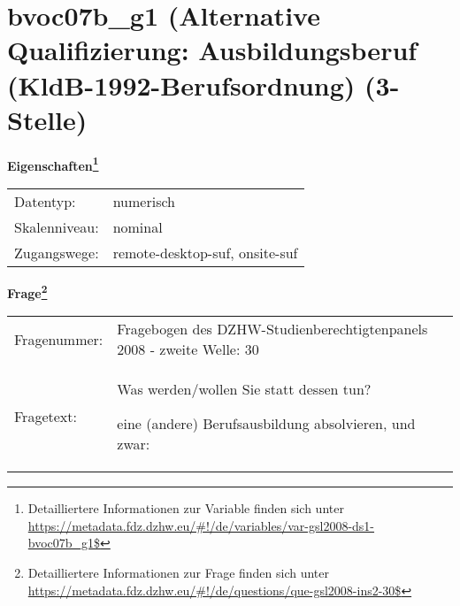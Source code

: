
    \setcounter{footnote}{0}

    \vspace*{-1.8cm}
	\section{bvoc07b\_g1 (Alternative Qualifizierung: Ausbildungsberuf (KldB-1992-Berufsordnung) (3-Stelle)}
	\label{section:bvoc07b_g1}



    \vspace*{0.5cm}
    \noindent\textbf{Eigenschaften\footnote{Detailliertere Informationen zur Variable finden sich unter
		\url{https://metadata.fdz.dzhw.eu/\#!/de/variables/var-gsl2008-ds1-bvoc07b_g1$}}}\\
	\begin{tabularx}{\hsize}{@{}lX}
	Datentyp: & numerisch \\
	Skalenniveau: & nominal \\
	Zugangswege: &
	  remote-desktop-suf, 
	  onsite-suf
 \\
    \end{tabularx}



				\vspace*{0.5cm}
                \noindent\textbf{Frage\footnote{Detailliertere Informationen zur Frage finden sich unter
		              \url{https://metadata.fdz.dzhw.eu/\#!/de/questions/que-gsl2008-ins2-30$}}}\\
				\begin{tabularx}{\hsize}{@{}lX}
					Fragenummer: &
					  Fragebogen des DZHW-Studienberechtigtenpanels 2008 - zweite Welle:
					  30
 \\
					Fragetext: & Was werden/wollen Sie statt dessen tun?\par  eine (andere) Berufsausbildung absolvieren, und zwar: \\
				\end{tabularx}





